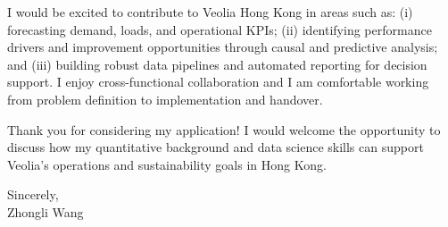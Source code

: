 \documentclass[11pt]{article}
\begin{document}
I would be excited to contribute to Veolia Hong Kong in areas such as:
(i) forecasting demand, loads, and operational KPIs;
(ii) identifying performance drivers and improvement opportunities through causal and predictive analysis; and
(iii) building robust data pipelines and automated reporting for decision support.
I enjoy cross-functional collaboration and I am comfortable working from problem definition to implementation and handover.

Thank you for considering my application!
I would welcome the opportunity to discuss how my quantitative background and data science skills can support Veolia's operations and sustainability goals in Hong Kong.
\vspace{0.1mm}

\noindent Sincerely, \\[0.5cm]

\noindent Zhongli Wang
\end{document}
